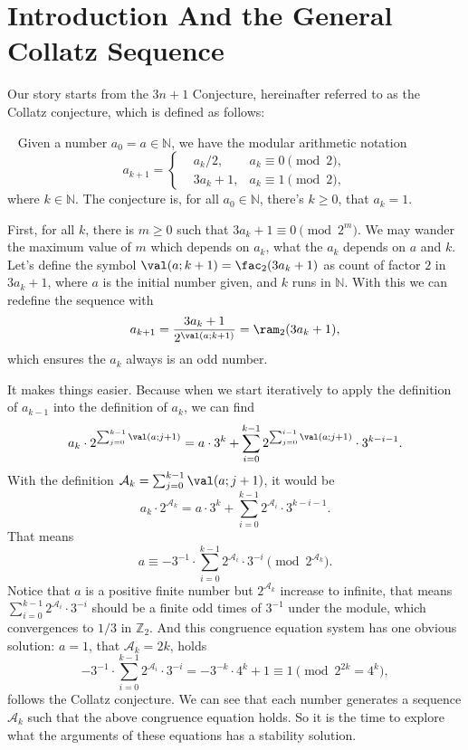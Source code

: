 \section{Introduction And the General Collatz Sequence}\label{sec:introduction-and-the-general-collatz-sequence} %
Our story starts from the $3n + 1$ Conjecture, hereinafter referred to as the Collatz conjecture, which is defined as follows:
\begin{conjecture}~\label{conjecture:original-conjecture}
Given a number $a_0 = a \in \mathbb{N}$, we have the modular arithmetic notation
\[a_{k+1} = \left\{\begin{aligned}
    &a_{k}/2, &a_{k}\equiv 0\pmod{2}, \\
    &3a_{k}+1, &a_{k}\equiv 1\pmod{2},
\end{aligned}\right.\]
where $k \in \mathbb{N}$.
The conjecture is, for all $a_0 \in \mathbb{N}$, there's $k \ge 0$, that $a_{k} = 1$.
\end{conjecture}

First, for all $k$, there is $m \ge 0$ such that $3a_{k}+1 \equiv 0 \pmod{2^{m}}$.
We may wander the maximum value of $m$ which depends on $a_k$, what the $a_k$ depends on $a$ and $k$.
Let's define the symbol $\val(a;k+1) = \fac_{2}(3a_{k}+1)$ as count of factor $2$ in $3a_{k}+1$, where $a$ is the initial number given, and $k$ runs in $\mathbb{N}$.
With this we can redefine the sequence with
\[ a_{k + 1} = \frac{3a_{k}+1}{2^{\val(a;k+1)}} = \ram_{2}(3a_{k}+1), \]
which ensures the $a_k$ always is an odd number.

It makes things easier.
Because when we start iteratively to apply the definition of $a_{k-1}$ into the definition of $a_{k}$, we can find
\[ a_k \cdot 2^{\sum_{j=0}^{k-1}\val(a;j+1)} = a \cdot 3 ^ k + \sum_{i = 0}^{k - 1}2^{\sum_{j=0}^{i-1}\val(a;j+1)}\cdot3^{k-i-1}.  \]
With the definition $\mathcal{A}_{k} = \sum_{j=0}^{k-1}\val(a;j+1)$, it would be
\[ a_k \cdot 2^{\mathcal{A}_k} = a \cdot 3 ^ k + \sum_{i = 0}^{k - 1}2^{\mathcal{A}_i}\cdot3^{k-i-1}. \label{equation:collatz-inductioon-3-2-1}\]
That means
\[ a \equiv -3^{-1} \cdot \sum_{i = 0}^{k - 1}2^{\mathcal{A}_i}\cdot3^{-i} \pmod{2^{\mathcal{A}_k}}. \]
Notice that $a$ is a positive finite number but $2^{\mathcal{A}_k}$ increase to infinite, that means $\sum_{i = 0}^{k - 1}2^{\mathcal{A}_i}\cdot3^{-i}$ should be a finite odd times of $3^{-1}$ under the module, which convergences to $1/3$ in $\mathbb{Z}_2$.
And this congruence equation system has one obvious solution: $a = 1$, that $\mathcal{A}_k = 2k$, holds
\[ -3^{-1} \cdot \sum_{i = 0}^{k - 1}2^{\mathcal{A}_i}\cdot3^{-i} = - 3^{-k}\cdot 4^k + 1 \equiv 1 \pmod{2^{2k} = 4^{k}}, \]
follows the Collatz conjecture.
We can see that each number generates a sequence $\mathcal{A}_{k}$ such that the above congruence equation holds.
So it is the time to explore what the arguments of these equations has a stability solution.

